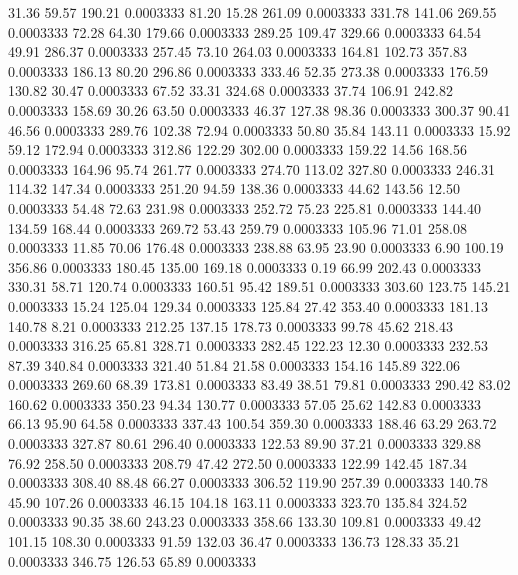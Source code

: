   31.36   59.57  190.21   0.0003333
  81.20   15.28  261.09   0.0003333
 331.78  141.06  269.55   0.0003333
  72.28   64.30  179.66   0.0003333
 289.25  109.47  329.66   0.0003333
  64.54   49.91  286.37   0.0003333
 257.45   73.10  264.03   0.0003333
 164.81  102.73  357.83   0.0003333
 186.13   80.20  296.86   0.0003333
 333.46   52.35  273.38   0.0003333
 176.59  130.82   30.47   0.0003333
  67.52   33.31  324.68   0.0003333
  37.74  106.91  242.82   0.0003333
 158.69   30.26   63.50   0.0003333
  46.37  127.38   98.36   0.0003333
 300.37   90.41   46.56   0.0003333
 289.76  102.38   72.94   0.0003333
  50.80   35.84  143.11   0.0003333
  15.92   59.12  172.94   0.0003333
 312.86  122.29  302.00   0.0003333
 159.22   14.56  168.56   0.0003333
 164.96   95.74  261.77   0.0003333
 274.70  113.02  327.80   0.0003333
 246.31  114.32  147.34   0.0003333
 251.20   94.59  138.36   0.0003333
  44.62  143.56   12.50   0.0003333
  54.48   72.63  231.98   0.0003333
 252.72   75.23  225.81   0.0003333
 144.40  134.59  168.44   0.0003333
 269.72   53.43  259.79   0.0003333
 105.96   71.01  258.08   0.0003333
  11.85   70.06  176.48   0.0003333
 238.88   63.95   23.90   0.0003333
   6.90  100.19  356.86   0.0003333
 180.45  135.00  169.18   0.0003333
   0.19   66.99  202.43   0.0003333
 330.31   58.71  120.74   0.0003333
 160.51   95.42  189.51   0.0003333
 303.60  123.75  145.21   0.0003333
  15.24  125.04  129.34   0.0003333
 125.84   27.42  353.40   0.0003333
 181.13  140.78    8.21   0.0003333
 212.25  137.15  178.73   0.0003333
  99.78   45.62  218.43   0.0003333
 316.25   65.81  328.71   0.0003333
 282.45  122.23   12.30   0.0003333
 232.53   87.39  340.84   0.0003333
 321.40   51.84   21.58   0.0003333
 154.16  145.89  322.06   0.0003333
 269.60   68.39  173.81   0.0003333
  83.49   38.51   79.81   0.0003333
 290.42   83.02  160.62   0.0003333
 350.23   94.34  130.77   0.0003333
  57.05   25.62  142.83   0.0003333
  66.13   95.90   64.58   0.0003333
 337.43  100.54  359.30   0.0003333
 188.46   63.29  263.72   0.0003333
 327.87   80.61  296.40   0.0003333
 122.53   89.90   37.21   0.0003333
 329.88   76.92  258.50   0.0003333
 208.79   47.42  272.50   0.0003333
 122.99  142.45  187.34   0.0003333
 308.40   88.48   66.27   0.0003333
 306.52  119.90  257.39   0.0003333
 140.78   45.90  107.26   0.0003333
  46.15  104.18  163.11   0.0003333
 323.70  135.84  324.52   0.0003333
  90.35   38.60  243.23   0.0003333
 358.66  133.30  109.81   0.0003333
  49.42  101.15  108.30   0.0003333
  91.59  132.03   36.47   0.0003333
 136.73  128.33   35.21   0.0003333
 346.75  126.53   65.89   0.0003333
